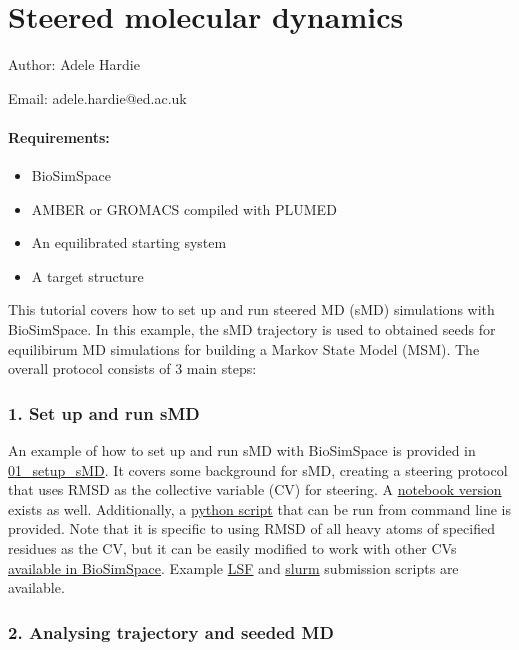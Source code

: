 \hypertarget{steered-molecular-dynamics}{%
\section{Steered molecular dynamics}\label{steered-molecular-dynamics}}

Author: Adele Hardie

Email: adele.hardie@ed.ac.uk

\hypertarget{requirements}{%
\paragraph{Requirements:}\label{requirements}}

\begin{itemize}
\tightlist
\item
  BioSimSpace
\item
  AMBER or GROMACS compiled with PLUMED
\item
  An equilibrated starting system
\item
  A target structure
\end{itemize}

This tutorial covers how to set up and run steered MD (sMD) simulations
with BioSimSpace. In this example, the sMD trajectory is used to
obtained seeds for equilibirum MD simulations for building a Markov
State Model (MSM). The overall protocol consists of 3 main steps:

\hypertarget{set-up-and-run-smd}{%
\subsubsection{1. Set up and run sMD}\label{set-up-and-run-smd}}

An example of how to set up and run sMD with BioSimSpace is provided in
\href{01_setup_sMD.md}{01\_setup\_sMD}. It covers some background for
sMD, creating a steering protocol that uses RMSD as the collective
variable (CV) for steering. A \href{01_setup_sMD_AMBER.ipynb}{notebook
version} exists as well. Additionally, a \href{01_run_sMD.py}{python
script} that can be run from command line is provided. Note that it is
specific to using RMSD of all heavy atoms of specified residues as the
CV, but it can be easily modified to work with other CVs
\href{https://biosimspace.org/api/index_Metadynamics_CollectiveVariable.html}{available
in BioSimSpace}. Example \href{01_run_sMD_LSF.sh}{LSF} and
\href{01_run_sMD_slurm.sh}{slurm} submission scripts are available.

\hypertarget{analysing-trajectory-and-seeded-md}{%
\subsubsection{2. Analysing trajectory and seeded
MD}\label{analysing-trajectory-and-seeded-md}}

